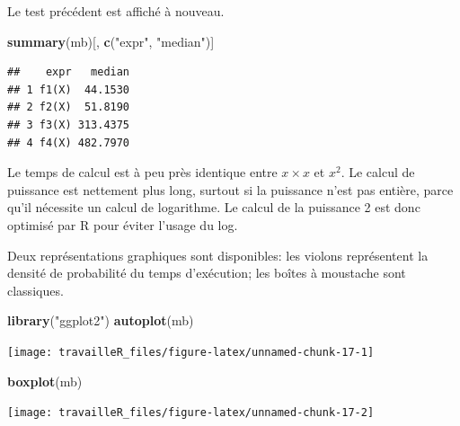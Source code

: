 \documentclass[
  12pt,
  french,
  a4paper,
  extrafontsizes,onecolumn,openright
  ]{memoir}
\newenvironment{Shaded}{\begin{snugshade}}{\end{snugshade}}
\newcommand{\KeywordTok}[1]{\textcolor[rgb]{0.13,0.29,0.53}{\textbf{#1}}}
\newcommand{\NormalTok}[1]{#1}
\newcommand{\StringTok}[1]{\textcolor[rgb]{0.31,0.60,0.02}{#1}}
\begin{document}
\normalsize

Le test précédent est affiché à nouveau.

\scriptsize

\begin{Shaded}
\begin{Highlighting}[]
\KeywordTok{summary}\NormalTok{(mb)[, }\KeywordTok{c}\NormalTok{(}\StringTok{"expr"}\NormalTok{, }\StringTok{"median"}\NormalTok{)]}
\end{Highlighting}
\end{Shaded}

\begin{verbatim}
##    expr   median
## 1 f1(X)  44.1530
## 2 f2(X)  51.8190
## 3 f3(X) 313.4375
## 4 f4(X) 482.7970
\end{verbatim}

\normalsize

Le temps de calcul est à peu près identique entre \(x \times x\) et \(x^2\).
Le calcul de puissance est nettement plus long, surtout si la puissance n'est pas entière, parce qu'il nécessite un calcul de logarithme.
Le calcul de la puissance 2 est donc optimisé par R pour éviter l'usage du log.

Deux représentations graphiques sont disponibles: les violons représentent la densité de probabilité du temps d'exécution; les boîtes à moustache sont classiques.

\scriptsize

\begin{Shaded}
\begin{Highlighting}[]
\KeywordTok{library}\NormalTok{(}\StringTok{"ggplot2"}\NormalTok{)}
\KeywordTok{autoplot}\NormalTok{(mb)}
\end{Highlighting}
\end{Shaded}

\begin{center}\texttt{[image: travailleR\_files/figure-latex/unnamed-chunk-17-1]} \end{center}

\begin{Shaded}
\begin{Highlighting}[]
\KeywordTok{boxplot}\NormalTok{(mb)}
\end{Highlighting}
\end{Shaded}

\begin{center}\texttt{[image: travailleR\_files/figure-latex/unnamed-chunk-17-2]} \end{center}
\end{document}
